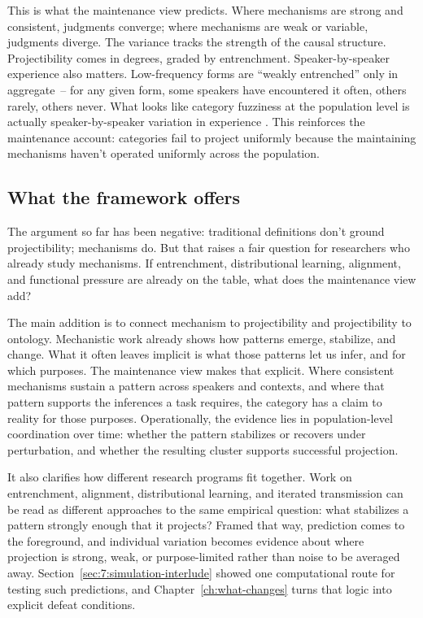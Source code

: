 This is what the maintenance view predicts. Where mechanisms are strong and consistent, judgments converge; where mechanisms are weak or variable, judgments diverge. The variance tracks the strength of the causal structure. Projectibility comes in degrees, graded by entrenchment. Speaker-by-speaker experience also matters. Low-frequency forms are \enquote{weakly entrenched} only in aggregate~-- for any given form, some speakers have encountered it often, others rarely, others never. What looks like category fuzziness at the population level is actually speaker-by-speaker variation in experience \citep{dabrowska2012}. This reinforces the maintenance account: categories fail to project uniformly because the maintaining mechanisms haven't operated uniformly across the population.


\subsection{What the framework offers}
\label{sec:7:what-framework-offers}

The argument so far has been negative: traditional definitions don't ground projectibility; mechanisms do. But that raises a fair question for researchers who already study mechanisms. If entrenchment, distributional learning, alignment, and functional pressure are already on the table, what does the maintenance view add?

The main addition is to connect mechanism to projectibility and projectibility to ontology. Mechanistic work already shows how patterns emerge, stabilize, and change. What it often leaves implicit is what those patterns let us infer, and for which purposes. The maintenance view makes that explicit. Where consistent mechanisms sustain a pattern across speakers and contexts, and where that pattern supports the inferences a task requires, the category has a claim to reality for those purposes. Operationally, the evidence lies in population-level coordination over time: whether the pattern stabilizes or recovers under perturbation, and whether the resulting cluster supports successful projection.

It also clarifies how different research programs fit together. Work on entrenchment, alignment, distributional learning, and iterated transmission can be read as different approaches to the same empirical question: what stabilizes a pattern strongly enough that it projects? Framed that way, prediction comes to the foreground, and individual variation becomes evidence about where projection is strong, weak, or purpose-limited rather than noise to be averaged away. Section~\ref{sec:7:simulation-interlude} showed one computational route for testing such predictions, and Chapter~\ref{ch:what-changes} turns that logic into explicit defeat conditions.

